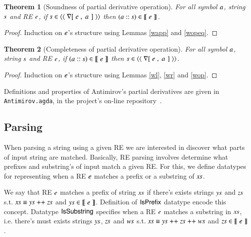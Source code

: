 \documentclass[review]{elsarticle}
\newtheorem{Theorem}{Theorem}
\newcommand{\D}[1]{\blue{\mathsf{#1}}}
\newcommand{\F}[1]{\green{\mathsf{#1}}}
\newcommand{\V}[1]{\purple{\mathit{#1}}}
\begin{document}
\begin{Theorem}[Soundness of partial derivative operation]
For all symbol \ensuremath{\V{a}}, string \ensuremath{\V{s}} and RE \ensuremath{\V{e}}, if \ensuremath{\V{s}\;\D{\in\langle\langle}\;\F{\nabla[}\;\V{e}\;\red{,}\,\;\V{a}\;\mskip1.5mu]\;\D{\rangle\rangle}} then \ensuremath{(\V{a}\;\V{::}\;\V{s})\;\D{\in\llbracket}\;\V{e}\;\D{\rrbracket}}.
\end{Theorem}
\begin{proof}
  Induction on \ensuremath{\V{e}}'s structure using Lemmas \ref{wapp} and \ref{wopeq}.
\end{proof}

\begin{Theorem}[Completeness of partial derivative operation]
For all symbol \ensuremath{\V{a}}, string \ensuremath{\V{s}} and RE \ensuremath{\V{e}}, if \ensuremath{(\V{a}\;\V{::}\;\V{s})\;\D{\in\llbracket}\;\V{e}\;\D{\rrbracket}} then \ensuremath{\V{s}\;\D{\in\langle\langle}\;\F{\nabla[}\;\V{e}\;\red{,}\,\;\V{a}\;\mskip1.5mu]\;\D{\rangle\rangle}}.
\end{Theorem}
\begin{proof}
  Induction on \ensuremath{\V{e}}'s structure using Lemmas \ref{wl}, \ref{wr} and \ref{wop}.
\end{proof}

Definitions and properties of Antimirov's partial derivatives are given in
\texttt{Antimirov.agda}, in the project's on-line
repository~\cite{regex-rep}.

\subsection{Parsing}

When parsing a string using a given RE we are interested in discover what parts of
input string are matched. Basically, RE parsing involves determine what prefixes and
substring's of input match a given RE. For this, we define datatypes for representing
when a RE \ensuremath{\V{e}} matches a prefix or a substring of \ensuremath{\V{xs}}.


We say that RE \ensuremath{\V{e}} matches a prefix of string \ensuremath{\V{xs}} if there's exists strings \ensuremath{\V{ys}} and
\ensuremath{\V{zs}} s.t. \ensuremath{\V{xs}\;\D{\equiv}\;\V{ys}\;\F{++}\;\V{zs}} and \ensuremath{\V{ys}\;\D{\in\llbracket}\;\V{e}\;\D{\rrbracket}}. Definition of \ensuremath{\D{IsPrefix}} datatype encode
this concept. Datatype \ensuremath{\D{IsSubstring}} specifies when a RE \ensuremath{\V{e}} matches a substring in \ensuremath{\V{xs}},
i.e. there's must exists strings \ensuremath{\V{ys}}, \ensuremath{\V{zs}} and \ensuremath{\V{ws}} s.t. \ensuremath{\V{xs}\;\D{\equiv}\;\V{ys}\;\F{++}\;\V{zs}\;\F{++}\;\V{ws}} and
\ensuremath{\V{zs}\;\D{\in\llbracket}\;\V{e}\;\D{\rrbracket}}.
\end{document}
